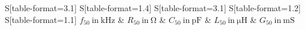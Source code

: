 \begin{table}
    \centering
    \caption{Beim Kurzschließen des $50\Omega$-Kables gemessene Werte für $R_{50},C_{50},L_{50}$ und daruas berechnete Werte für $G_{50}$ bei den jeweils eingestellten Frequenzen $f$}
    \label{tab:RLC50Werte}
    \begin{tabular}{
	S[table-format=3.1]
	S[table-format=1.4]
	S[table-format=3.1]
	S[table-format=1.2]
	S[table-format=1.1]
	}
	\toprule
	{$f_{50} \ \mathrm{in} \ \si{\kilo\hertz}$}		& {$R_{50} \ \mathrm{in} \ \si{\ohm}$}		& 
	{$C_{50} \ \mathrm{in} \ \si{\pico\farad}$}		& {$L_{50} \ \mathrm{in} \ \si{\micro\henry}$}		& 
	{$G_{50} \ \mathrm{in} \ \si{\milli\siemens}$}		\\ 
	\midrule
    
    \bottomrule
    \end{tabular}
    \end{table}
